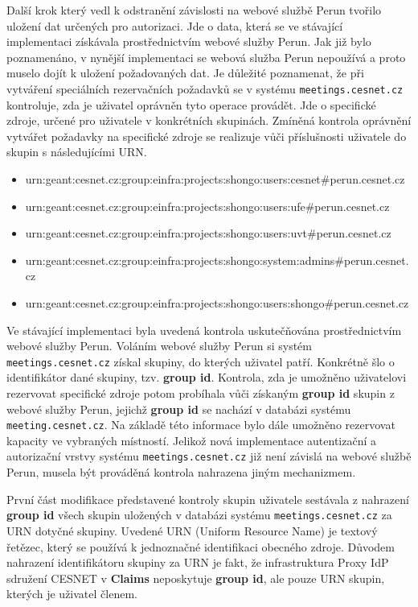 \documentclass[
  printed, %
  twoside, %
  table,   %
  nolof,     %
  nolot,     %
]{fithesis3}
\begin{document}
Další krok který vedl k odstranění závislosti na webové službě Perun tvořilo uložení dat určených pro autorizaci. Jde o data, která se ve stávající implementaci získávala prostřednictvím webové služby Perun. Jak již bylo poznamenáno, v nynější implementaci se webová služba Perun nepoužívá a proto muselo dojít k uložení požadovaných dat. Je důležité poznamenat, že při vytváření speciálních rezervačních požadavků se v systému \texttt{meetings.cesnet.cz} kontroluje, zda je uživatel oprávněn tyto operace provádět. Jde o specifické zdroje, určené pro uživatele v konkrétních skupinách. Zmíněná kontrola oprávnění vytvářet požadavky na specifické zdroje se realizuje vůči příslušnosti uživatele do skupin s následujícími URN. 
\begin{itemize}
    \item urn:geant:cesnet.cz:group:einfra:projects:shongo:users:cesnet\#perun.cesnet.cz
    \item urn:geant:cesnet.cz:group:einfra:projects:shongo:users:ufe\#perun.cesnet.cz
    \item urn:geant:cesnet.cz:group:einfra:projects:shongo:users:uvt\#perun.cesnet.cz
    \item urn:geant:cesnet.cz:group:einfra:projects:shongo:system:admins\#perun.cesnet.cz
    \item urn:geant:cesnet.cz:group:einfra:projects:shongo:users:shongo\#perun.cesnet.cz
\end{itemize}

Ve stávající implementaci byla uvedená kontrola uskutečňována prostřednictvím webové služby Perun. Voláním webové služby Perun si systém \texttt{meetings.cesnet.cz} získal skupiny, do kterých uživatel patří. Konkrétně šlo o identifikátor dané skupiny, tzv. \textbf{group id}. Kontrola, zda je umožněno uživatelovi rezervovat specifické zdroje potom probíhala vůči získaným \textbf{group id} skupin z webové služby Perun, jejichž \textbf{group id} se nachází v databázi systému \texttt{meeting.cesnet.cz}. Na základě této informace bylo dále umožněno rezervovat kapacity ve vybraných místností. Jelikož nová implementace autentizační a autorizační vrstvy systému \texttt{meetings.cesnet.cz} již není závislá na webové službě Perun, musela být prováděná kontrola nahrazena jiným mechanizmem. 

\par
První část modifikace představené kontroly skupin uživatele sestávala z nahrazení \textbf{group id} všech skupin uložených v databázi systému \texttt{meetings.cesnet.cz} za URN \cite{rfc2141} dotyčné skupiny. Uvedené URN (Uniform Resource Name) je textový řetězec, který se používá k jednoznačné identifikaci obecného zdroje. Důvodem nahrazení identifikátoru skupiny za URN je fakt, že infrastruktura Proxy IdP sdružení CESNET v \textbf{Claims} neposkytuje \textbf{group id}, ale pouze URN skupin, kterých je uživatel členem. 
\end{document}
